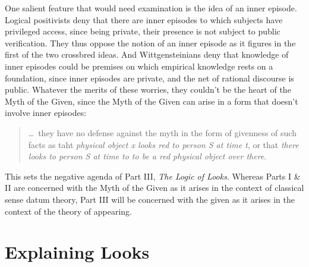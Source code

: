 \documentclass[11pt]{article}
\begin{document}
One salient feature that would need examination is the idea of an inner episode. Logical positivists deny that there are inner episodes to which subjects have privileged access, since being private, their presence is not subject to public verification. They thus oppose the notion of an inner episode as it figures in the first of the two crossbred ideas. And Wittgensteinians deny that knowledge of inner episodes could be premises on which empirical knowledge rests on a foundation, since inner episodes are private, and the net of rational discourse is public. Whatever the merits of these worries, they couldn't be the heart of the Myth of the Given, since the Myth of the Given can arise in a form that doesn't involve inner episodes:
\begin{quote}
    \ldots\ they have no defense against the myth in the form of givenness of such facts as taht \emph{physical object x looks red to person S at time t}, or that \emph{there looks to person S at time to to be a red physical object over there}.
\end{quote}
This sets the negative agenda of Part III, \emph{The Logic of Looks}. Whereas Parts I \& II are concerned with the Myth of the Given as it arises in the context of classical sense datum theory, Part III will be concerned with the given as it arises in the context of the theory of appearing. 


\section{Explaining Looks} %
\label{sec:explaining_looks}



\end{document}
